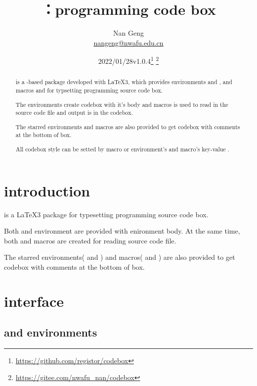 \documentclass{ctxdoc-en}
\title{\bfseries\pkg{codebox}：programming code box}
\author{Nan Geng\\ \url{nangeng@nwafu.edu.cn}}
\date{2022/01/28\qquad v1.0.4\thanks{\url{https://github.com/registor/codebox}}
\thanks{\url{https://gitee.com/nwafu_nan/codebox}}}
\begin{document}
\maketitle

\begin{abstract}

 is a -based package developed with \LaTeX3,
which provides environments  and , and macros
 and  for typsetting programming source code box.

The environments create codebox with it's body and
macros is used to read in the source code file and output is in the codebox.

The starred environments and macros are also provided
to get codebox with comments at the bottom of box.

All codebox style can be setted by  macro
or environment's and macro's key-value .

\end{abstract}

\tableofcontents

\section{introduction}

 is a \LaTeX3 package for typesetting programming source code box.

Both  and  environment are provided with enironment body.
At the same time, both  and  macros are created
for reading source code file.

The starred environments( and ) and
macros( and ) are also provided
to get codebox with comments at the bottom of box.

\section{interface}

\subsection{ and  environments}
\end{document}
